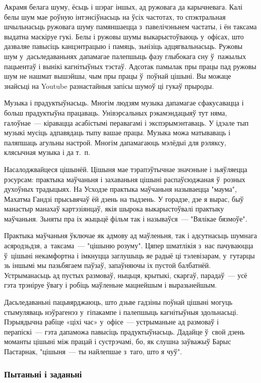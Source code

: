 Акрамя белага шуму, ёсьць і шэраг іншых, ад ружовага да карычневага. Калі белы шум мае роўную інтэнсіўнасьць на ўсіх частотах, то спэктральная шчыльнасьць ружовага шуму памяншаецца з~павелічэньнем частаты, і ён таксама выдатна маскіруе гукі. Белы і ружовы шумы выкарыстоўваюць у~офісах, што дазваляе павысіць канцэнтрацыю і памяць, зьнізіць адцягвальнасьць. Ружовы шум у~дасьледаваньнях дапамагае палепшыць фазу глыбокага сну ў~пажылых пацыентаў і вынікі кагнітыўных тэстаў. Адсотак памылак пры працы пад ружовы шум не нашмат вышэйшы, чым пры працы ў~поўнай цішыні. Вы можаце знайсьці на Youtube разнастайныя запісы шумоў ці гукаў прыроды.

Музыка і прадуктыўнасьць. Многім людзям музыка дапамагае сфакусавацца і больш прадуктыўна працаваць. Унівэрсальных рэкамэндацыяў тут няма, галоўнае~--- кіравацца асабістымі перавагамі і экспэрымэнтаваць. У ідэале тып музыкі мусіць адпавядаць тыпу вашае працы. Музыка можа матываваць і паляпшаць агульны настрой. Многім дапамагаюць мэлёдыі для рэляксу, клясычная музыка і да т.~п.

Насалоджвайцеся цішынёй. Цішыня мае тэрапэўтычнае значэньне і зьяўляецца рэсурсам: практыка маўчаньня і захаваньня цішыні распаўсюджаная ў~розных духоўных традыцыях. На Усходзе практыка маўчаньня называецца "маума", Махатма Гандзі прысьвячаў ёй дзень на тыдзень. У горадзе, дзе я вырас, быў манастыр манахаў картэзіянцаў, якія шырока выкарыстоўвалі практыку маўчаньня. Зьняты пра іх жыцьцё фільм так і называўся~--- "Вялікае бязмоўе".

Практыка маўчаньня ўключае як адмову ад маўленьня, так і адсутнасьць шумнага асяродзьдзя, а~таксама~--- "цішыню розуму". Цяпер шматлікія з~нас пачуваюцца ў~цішыні некамфортна і імкнуцца заглушыць яе радыё ці тэлевізарам, у~гутарцы зь іншымі мы пазьбягаем паўзаў, запаўняючы іх пустой балбатнёй. Устрыманасьць ад пустых размоваў, ныцьця, крытыкі, скаргаў, парадаў~--- усё гэта трэніруе ўвагу і робіць маўленьне мацнейшым і выразьнейшым.

Дасьледаваньні пацьвярджаюць, што дзьве гадзіны поўнай цішыні могуць стымуляваць нэўрагенэз у~гіпакампе і палепшыць кагнітыўныя здольнасьці. Пэрыядычна рабіце «ціхі час» у~офісе~--- устрыманьне ад размоваў і перапіскі~--- гэта дапаможа павысіць прадуктыўнасьць. Дадайце ў~свой дзень моманты цішыні між працай і сустрэчамі, бо, як слушна заўважыў Барыс Пастарнак, "цішыня~--- ты найлепшае з~таго, што я чуў".

\subsubsection{Пытаньні і заданьні}

